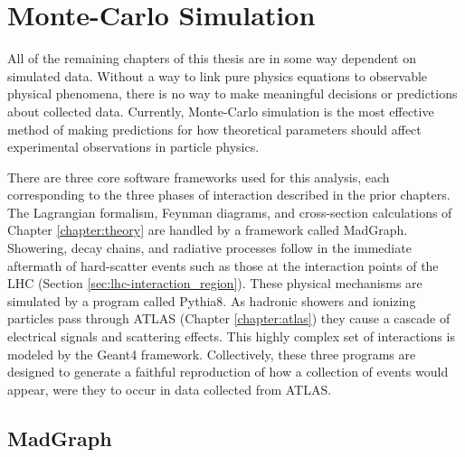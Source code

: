 \FloatBarrier
\section{Monte-Carlo Simulation} \label{sec:mcsim}
    
    All of the remaining chapters of this thesis are in some way dependent on simulated data.
    Without a way to link pure physics equations to observable physical phenomena,
        there is no way to make meaningful decisions or predictions about collected data.
    Currently, Monte-Carlo simulation is the most effective method of making predictions
        for how theoretical parameters should affect experimental observations in particle physics.

    There are three core software frameworks used for this analysis,
        each corresponding to the three phases of interaction described in the prior chapters.
    The Lagrangian formalism, Feynman diagrams, and cross-section calculations of Chapter \ref{chapter:theory}
        are handled by a framework called MadGraph.
    Showering, decay chains, and radiative processes follow in the immediate aftermath of
        hard-scatter events such as those at the interaction points of the LHC (Section \ref{sec:lhc-interaction_region}).
    These physical mechanisms are simulated by a program called Pythia8.
    As hadronic showers and ionizing particles pass through ATLAS (Chapter \ref{chapter:atlas})
        they cause a cascade of electrical signals and scattering effects.
    This highly complex set of interactions is modeled by the Geant4 framework.
    Collectively, these three programs are designed to
        generate a faithful reproduction of how a collection of \hhproc events would appear,
        were they to occur in data collected from ATLAS.


    \subsection{MadGraph}

